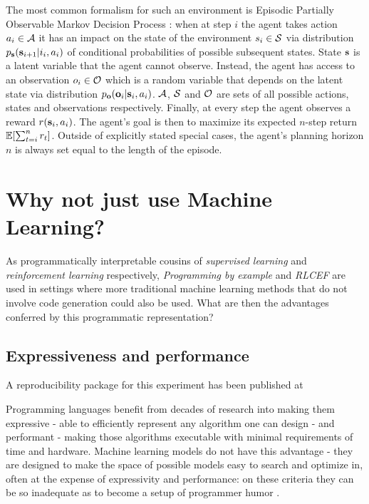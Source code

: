 The most common formalism for such an environment is Episodic Partially Observable Markov Decision Process \cite{kramerjdavidrPartiallyObservableMarkov1964, spaanPartiallyObservableMarkov2012}: when at step $i$ the agent takes action $a_i \in \mathcal{A}$ it has an impact on  the state of the environment $s_i \in \mathcal{S}$ via distribution $p_{\textbf{s}}(\textbf{s}_{i+1} | i_i, a_i)$ of conditional probabilities of possible subsequent states. 
State $\textbf{s}$ is a latent variable that the agent cannot observe.
Instead, the agent has access to an observation $o_i \in \mathcal{O}$ which is a random variable that depends on the latent state via distribution $p_{\mathbf{o}}(\mathbf{o}_i | \textbf{s}_i, a_i)$.
$\mathcal{A}$, $\mathcal{S}$ and $\mathcal{O}$ are sets of all possible actions, states and observations respectively.
Finally, at every step the agent observes a reward $r(\textbf{s}_i,a_i)$.
The agent's goal is then to maximize its expected $n$-step return $\mathbb{E} [ \sum_{t=i}^{n} r_t ]$. Outside of explicitly stated special cases, the agent's planning horizon $n$ is always set equal to the length of the episode.

\newpage
\section{Why not just use Machine Learning?}
\label{sec:whynotml}

As programmatically interpretable cousins of \emph{supervised learning} and \emph{reinforcement learning} respectively, \emph{Programming by example} and \emph{RLCEF} are  used in settings where more traditional machine learning methods that do not involve code generation could also be used.
What are then the advantages conferred by this programmatic representation?

\subsection{Expressiveness and performance}
\begin{remark}
    A reproducibility package for this experiment has been published at \cite{Vadim0x60FizzbuzzlmSearching}
\end{remark}

Programming languages benefit from decades of research into making them \textcolor{accent}{expressive} - able to efficiently represent any algorithm one can design - and \textcolor{accent}{performant} - making those algorithms executable with minimal requirements of time and hardware.
Machine learning models do not have this advantage - they are designed to make the space of possible models easy to search and optimize in, often at the expense of expressivity and performance: on these criteria they can be so inadequate as to become a setup of programmer humor \cite{JoelGrusFizz}.

